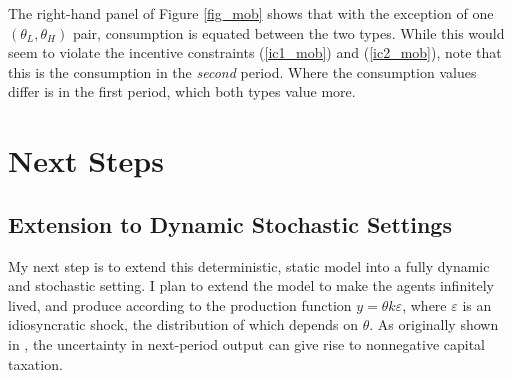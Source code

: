 \documentclass[11pt]{article}
\begin{document}
The right-hand panel of Figure \ref{fig_mob} shows that with the exception of one \( (\theta_L, \theta_H) \) pair, consumption is equated between the two types. While this would seem to violate the incentive constraints (\ref{ic1_mob}) and (\ref{ic2_mob}), note that this is the consumption in the \textit{second} period. Where the consumption values differ is in the first period, which both types value more. 

\section{Next Steps}
\subsection{Extension to Dynamic Stochastic Settings}
My next step is to extend this deterministic, static model into a fully dynamic and stochastic setting. I plan to extend the model to make the agents infinitely lived, and produce according to the production function \( y = \theta k \varepsilon \), where \( \varepsilon \) is an idiosyncratic shock, the distribution of which depends on \( \theta \). As originally shown in \cite{golosov2003optimal}, the uncertainty in next-period output can give rise to nonnegative capital taxation. 



\end{document}
